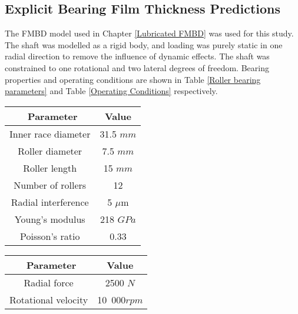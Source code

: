 \subsection{Explicit Bearing Film Thickness Predictions}

The FMBD model used in Chapter \ref{Lubricated FMBD} was used for this study. The shaft was modelled as a rigid body, and loading was purely static in one radial direction to remove the influence of dynamic effects. The shaft was constrained to one rotational and two lateral degrees of freedom. Bearing properties and operating conditions are shown in Table \ref{Roller bearing parameters} and Table \ref{Operating Conditions} respectively.

\begin{table*}
	\caption{Roller Bearing Parameters}
	\label{Roller bearing parameters}
	\centering
	\renewcommand{\arraystretch}{1.5}%
	\begin{tabular}{|c|c|}
		\hline
		\ \textbf{Parameter} & \textbf{Value} \\ [0.5ex]
		\hline
		Inner race diameter & 31.5 $mm$ \\ [0.5ex]
		\hline
		Roller diameter & 7.5 $mm$ \\ [0.5ex]
		\hline
		Roller length & 15 $mm$ \\ [0.5ex]
		\hline
		Number of rollers & 12 \\ [0.5ex]
		\hline
		Radial interference & 5 $\mu \mathrm{m}$ \\ [0.5ex]
		\hline
		Young's modulus & 218 $GPa$ \\ [0.5ex]
		\hline
		Poisson's ratio & 0.33 \\ [0.5ex]
		\hline
	\end{tabular}
\end{table*}

\begin{table*}
	\caption{Operating Conditions}
	\label{Operating Conditions}
	\centering
	\renewcommand{\arraystretch}{1.5}%
	\begin{tabular}{|c|c|}
		\hline
		\ \textbf{Parameter} & \textbf{Value} \\ [0.5ex]
		\hline
		Radial force & 2500 $N$ \\ [0.5ex]
		\hline
		Rotational velocity & 10~000$rpm$ \\ [0.5ex]
		\hline
	\end{tabular}
\end{table*}

